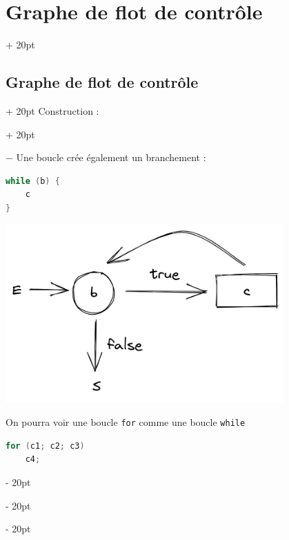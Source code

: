 \documentclass[a4paper, 12pt, twoside]{article}
\newcommand{\ind}[1][20pt]{\advance\leftskip + #1}
\newcommand{\deind}[1][20pt]{\advance\leftskip - #1}
\newenvironment{indentedenv}[1][20pt]{\par \ind[#1]}{\par \deind}
\newenvironment{indt}[2][20pt]{#2 \begin{indentedenv}[#1]}{\end{indentedenv}} %
\begin{document}
\begin{indt}{\section{Graphe de flot de contrôle}}
\begin{indt}{\subsection{Graphe de flot de contrôle}}
\begin{indt}{Construction :}
                \vspace{12pt}
                
                $-$ Une boucle crée également un branchement :
                
                \begin{lstlisting}[language=C, xleftmargin=80pt]
while (b) {
    c
}\end{lstlisting}
                
                
                \begin{center}
                    \includegraphics[scale=.4]{draw/draw_while.png}
                \end{center}
                
                \vspace{6pt}
                
                On pourra voir une boucle \texttt{for} comme une boucle \texttt{while}
                
                \begin{lstlisting}[language=C, xleftmargin=80pt]
for (c1; c2; c3)
    c4;\end{lstlisting}
                

\end{indt}
\end{indt}
\end{indt}
\end{document}
